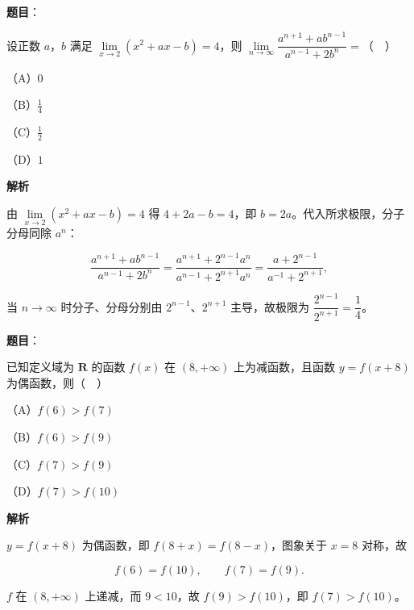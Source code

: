 \begin{answer}

\textbf{题目}：

设正数 $a$，$b$ 满足 $\lim\limits_{x\to2}(x^2+ax-b)=4$，则 $\lim\limits_{n\to\infty}\dfrac{a^{n+1}+ab^{n-1}}{a^{n-1}+2b^n}=$（　）

（A）$0$

（B）$\frac14$

（C）$\frac12$

（D）$1$

\textbf{解析}

由 $\lim\limits_{x\to2}(x^2+ax-b)=4$ 得 $4+2a-b=4$，即 $b=2a$。代入所求极限，分子分母同除 $a^n$：

\nopagebreak[4]
\[\frac{a^{n+1}+ab^{n-1}}{a^{n-1}+2b^n}=\frac{a^{n+1}+2^{n-1}a^n}{a^{n-1}+2^{n+1}a^n}=\frac{a+2^{n-1}}{a^{-1}+2^{n+1}},\]

当 $n\to\infty$ 时分子、分母分别由 $2^{n-1}$、$2^{n+1}$ 主导，故极限为 $\dfrac{2^{n-1}}{2^{n+1}}=\dfrac14$。


\end{answer}
\begin{answer}

\textbf{题目}：

已知定义域为 $\mathbf R$ 的函数 $f(x)$ 在 $(8,+\infty)$ 上为减函数，且函数 $y=f(x+8)$ 为偶函数，则（　）

（A）$f(6)>f(7)$

（B）$f(6)>f(9)$

（C）$f(7)>f(9)$

（D）$f(7)>f(10)$

\textbf{解析}

$y=f(x+8)$ 为偶函数，即 $f(8+x)=f(8-x)$，图象关于 $x=8$ 对称，故

\nopagebreak[4]
\[f(6)=f(10),\qquad f(7)=f(9).\]

$f$ 在 $(8,+\infty)$ 上递减，而 $9<10$，故 $f(9)>f(10)$，即 $f(7)>f(10)$。


\end{answer}

